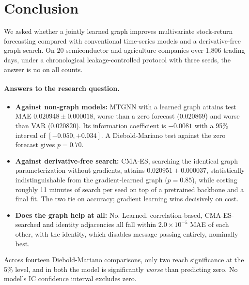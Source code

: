 \section{Conclusion}
\label{sec:conclusion}

We asked whether a jointly learned graph improves multivariate stock-return forecasting compared with conventional time-series models and a derivative-free graph search. On 20 semiconductor and agriculture companies over 1{,}806 trading days, under a chronological leakage-controlled protocol with three seeds, the answer is no on all counts.

\paragraph{Answers to the research question.}
\begin{itemize}[nosep]
    \item \textbf{Against non-graph models:} MTGNN with a learned graph attains test MAE $0.020948 \pm 0.000018$, worse than a zero forecast ($0.020869$) and worse than VAR ($0.020820$). Its information coefficient is $-0.0081$ with a 95\% interval of $[-0.050, +0.034]$. A Diebold-Mariano test against the zero forecast gives $p = 0.70$.
    \item \textbf{Against derivative-free search:} CMA-ES, searching the identical graph parameterization without gradients, attains $0.020951 \pm 0.000037$, statistically indistinguishable from the gradient-learned graph ($p = 0.85$), while costing roughly 11 minutes of search per seed on top of a pretrained backbone and a final fit. The two tie on accuracy; gradient learning wins decisively on cost.
    \item \textbf{Does the graph help at all:} No. Learned, correlation-based, CMA-ES-searched and identity adjacencies all fall within $2.0 \times 10^{-5}$ MAE of each other, with the identity, which disables message passing entirely, nominally best.
\end{itemize}

Across fourteen Diebold-Mariano comparisons, only two reach significance at the 5\% level, and in both the model is significantly \emph{worse} than predicting zero. No model's IC confidence interval excludes zero.


